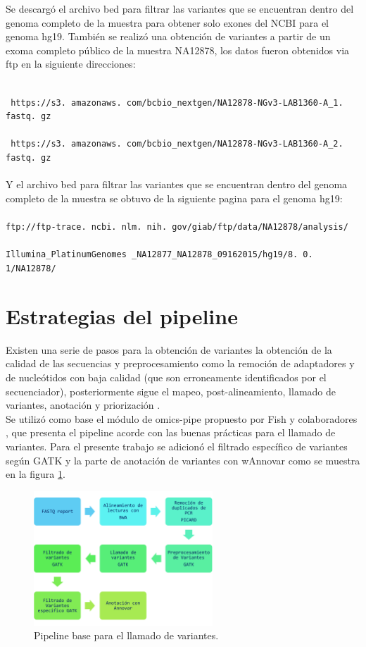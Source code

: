 Se descargó el archivo bed para filtrar las variantes que se encuentran dentro del genoma completo de la muestra para obtener solo exones del NCBI para el genoma hg19. También se realizó una obtención de variantes a partir de un exoma completo público de la muestra NA12878, los datos fueron obtenidos via ftp en la siguiente direcciones:\\
\\
{\texttt{ https://s3. amazonaws. com/bcbio\_nextgen/NA12878-NGv3-LAB1360-A\_1. fastq. gz}\\
\\
{\texttt{ https://s3. amazonaws. com/bcbio\_nextgen/NA12878-NGv3-LAB1360-A\_2. fastq. gz}}\\
\\
Y el archivo bed para filtrar las variantes que se encuentran dentro del genoma completo de la muestra se obtuvo de la siguiente pagina para el genoma hg19: \\
\\
\texttt{ftp://ftp-trace. ncbi. nlm. nih. gov/giab/ftp/data/NA12878/analysis/}\\
\\
\texttt{Illumina\_PlatinumGenomes \_NA12877\_NA12878\_09162015/hg19/8. 0. 1/NA12878/} 

\section{Estrategias del pipeline}

Existen una serie de pasos para la obtención de variantes la obtención de la calidad de las secuencias y preprocesamiento como la remoción de adaptadores y de nucleótidos con baja calidad (que son erroneamente identificados por el secuenciador), posteriormente sigue el mapeo, post-alineamiento, llamado de variantes, anotación y priorización \cite{Bao2014}. \\

Se utilizó como base el módulo de omics-pipe propuesto por Fish y colaboradores \cite{Fisch2015}, que presenta el pipeline acorde con las buenas prácticas para el llamado de variantes. Para el presente trabajo se adicionó el filtrado específico de variantes según GATK y la parte de anotación de variantes con wAnnovar como se muestra  en la figura \ref{fig:pipeline2}. 

\begin{figure}[H] 
	\centering
	\includegraphics[width=0.6\textwidth]{Kap2/pipeline1}
	\caption{Pipeline base para el llamado de variantes. } \label{fig:pipeline2}
\end{figure}


}
